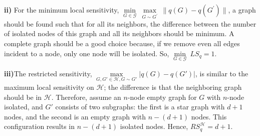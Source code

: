 \documentclass[12pt]{extarticle}
\begin{document}
\textbf{ii)} For the minimum local sensitivity, $\underset{G\in\mathcal{G}}{\min}\ \underset{G\sim G^{'}}{\max}\ \| q(G) - q(G^{'})\|$, a graph should be found such that for all its neighbors, the difference between the number of isolated nodes of this graph and all its neighbors should be minimum. A complete graph should be a good choice because, if we remove even all edges incident to a node, only one node will be isolated. So, \(\underset{G\in\mathcal{G}}{\min}\ LS_q = 1\).

\textbf{iii)}The restricted sensitivity, $\underset{G,G' \in \mathcal{H}, G \sim G'}{\max} |q(G) - q(G')|$, is similar to the maximum local sensitivity on $\mathcal{H}$; the difference is that the neighboring graph should be in $\mathcal{H}$. Therefore, assume an \(n\)-node empty graph for \(G\) with \(n\)-node isolated, and \(G'\) consists of two subgraphs: the first is a star graph with \(d+1\) nodes, and the second is an empty graph with \(n-(d+1)\) nodes. This configuration results in \(n-(d+1)\) isolated nodes. Hence, $RS_{q}^{\mathcal{H}} = d+1$.
 
\end{document}
